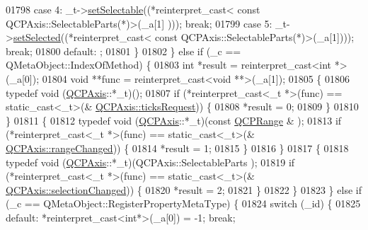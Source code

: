\begin{DoxyCode}
01798         \textcolor{keywordflow}{case} 4: \_t->\hyperlink{a00025_afa988209bf6519f63d6ef2e615dbe1ea}{setSelectable}((*\textcolor{keyword}{reinterpret\_cast<} \textcolor{keyword}{const }QCPAxis::SelectableParts(*)\textcolor{keyword}{>}(\_a[1]
      ))); \textcolor{keywordflow}{break};
01799         \textcolor{keywordflow}{case} 5: \_t->\hyperlink{a00025_a24c13908da2f8d629b1bbbe9cbd63e39}{setSelected}((*\textcolor{keyword}{reinterpret\_cast<} \textcolor{keyword}{const }QCPAxis::SelectableParts(*)\textcolor{keyword}{>}(\_a[1])));
       \textcolor{keywordflow}{break};
01800         \textcolor{keywordflow}{default}: ;
01801         \}
01802     \} \textcolor{keywordflow}{else} \textcolor{keywordflow}{if} (\_c == QMetaObject::IndexOfMethod) \{
01803         \textcolor{keywordtype}{int} *result = \textcolor{keyword}{reinterpret\_cast<}\textcolor{keywordtype}{int} *\textcolor{keyword}{>}(\_a[0]);
01804         \textcolor{keywordtype}{void} **func = \textcolor{keyword}{reinterpret\_cast<}\textcolor{keywordtype}{void} **\textcolor{keyword}{>}(\_a[1]);
01805         \{
01806             \textcolor{keyword}{typedef} void (\hyperlink{a00025}{QCPAxis}::*\_t)();
01807             \textcolor{keywordflow}{if} (*reinterpret\_cast<\_t *>(func) == \textcolor{keyword}{static\_cast<}\_t\textcolor{keyword}{>}(&
      \hyperlink{a00025_af46d99613d29518795134ec4928e3873}{QCPAxis::ticksRequest})) \{
01808                 *result = 0;
01809             \}
01810         \}
01811         \{
01812             \textcolor{keyword}{typedef} void (\hyperlink{a00025}{QCPAxis}::*\_t)(\textcolor{keyword}{const} \hyperlink{a00049}{QCPRange} & );
01813             \textcolor{keywordflow}{if} (*reinterpret\_cast<\_t *>(func) == \textcolor{keyword}{static\_cast<}\_t\textcolor{keyword}{>}(&
      \hyperlink{a00025_a0894084e4c16a1736534c4095746f910}{QCPAxis::rangeChanged})) \{
01814                 *result = 1;
01815             \}
01816         \}
01817         \{
01818             \textcolor{keyword}{typedef} void (\hyperlink{a00025}{QCPAxis}::*\_t)(QCPAxis::SelectableParts );
01819             \textcolor{keywordflow}{if} (*reinterpret\_cast<\_t *>(func) == \textcolor{keyword}{static\_cast<}\_t\textcolor{keyword}{>}(&
      \hyperlink{a00025_aece2d803d07dba9dc2ea96fcad186e34}{QCPAxis::selectionChanged})) \{
01820                 *result = 2;
01821             \}
01822         \}
01823     \} \textcolor{keywordflow}{else} \textcolor{keywordflow}{if} (\_c == QMetaObject::RegisterPropertyMetaType) \{
01824         \textcolor{keywordflow}{switch} (\_id) \{
01825         \textcolor{keywordflow}{default}: *\textcolor{keyword}{reinterpret\_cast<}\textcolor{keywordtype}{int}*\textcolor{keyword}{>}(\_a[0]) = -1; \textcolor{keywordflow}{break};

\end{DoxyCode}
